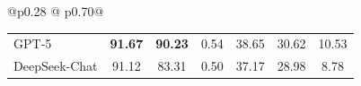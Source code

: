 \documentclass[acmsmall]{acmart}
\newcommand{\projName}{\textsc{Gordian}\xspace}
\theoremstyle{definition}
\begin{document}
\begin{table}[ht]
\begin{tabular}{@{}p{}
@{\hspace{0.00\columnwidth}}
p{}@{}}
\begin{tabular}{|l|ccc|ccc|}
GPT-5
& \textbf{91.67} & \textbf{90.23 } & 0.54
& 38.65 & 30.62 & 10.53 \\

DeepSeek-Chat
& 91.12 & 83.31 & 0.50
& 37.17 & 28.98 & 8.78 \\
\bottomrule
\end{tabular}
\end{tabular}
\vspace{-4mm}
\end{table}







\end{document}
